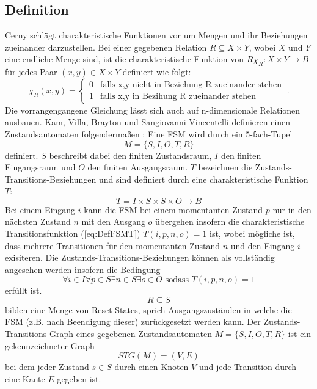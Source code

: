 \subsection{Definition}
\label{(subsec:DefFSM)}
Cerny \cite{Cer80} schlägt charakteristische Funktionen vor um Mengen und ihr Beziehungen zueinander darzustellen. Bei einer gegebenen Relation $R \subseteq X \times Y$, wobei $X$ und $Y$ eine endliche Menge sind, ist die charakteristische Funktion von $R \chi_R : X \times Y \rightarrow B$ für jedes Paar $(x,y) \in X \times Y$ definiert wie folgt:
\begin{equation}
\chi_R(x,y)=\begin{cases}
0 & \text{falls x,y nicht in Beziehung R zueinander stehen}\\
1& \text{falls x,y in Bezihung R zueinander stehen} 
\end{cases}\ \text{.}
\label{eq:charFunkt}
\end{equation}
Die vorrangengangene Gleichung lässt sich auch auf n-dimensionale Relationen ausbauen.
Kam, Villa, Brayton und Sangiovanni-Vincentelli \cite{KVBS97} definieren einen Zustandsautomaten folgendermaßen :
Eine FSM wird durch ein 5-fach-Tupel 
\begin{equation}
M=\{S,I,O,T,R\}
\label{eq:DefFSM}
\end{equation} definiert. $S$ beschreibt dabei den finiten Zustandsraum, $I$ den finiten Eingangsraum und $O$ den finiten Ausgangsraum. $T$ bezeichnen die Zustands-Transitions-Beziehungen und sind definiert durch eine charakteristische Funktion $T$: 
\begin{equation}
T=I \times S \times S \times O \xrightarrow {} B
\label{eq:DefFSMT}
\end{equation} Bei einem Eingang $i$ kann die FSM bei einem momentanten Zustand $p$ nur in den nächsten Zustand $n$ mit den Ausgang $o$ übergehen insofern die charakteristische Transitionsfunktion (\ref{eq:DefFSMT}) $T(i,p,n,o) = 1$ ist, wobei mögliche ist, dass mehrere Transitionen für den momentanten Zustand  $n$ und den Eingang $i$ exisiteren. Die Zustands-Transitions-Beziehungen können als vollständig angesehen werden insofern die Bedingung 
\begin{equation}
\forall i \in I \forall p \in S \exists n \in S \exists o \in O \text{ sodass } T(i,p,n,o) = 1
\label{eq:CondFSMT}
\end{equation}
erfüllt ist.
\begin{equation}
R \subseteq S
\label{eq:DefFSMR}
\end{equation} bilden eine Menge von Reset-States, sprich Ausgangszuständen in welche die FSM (z.B. nach Beendigung dieser) zurückgesetzt werden kann.
Der Zustands-Transitions-Graph eines gegebenen Zustandsautomaten $M = \{S,I,O,T,R\}$ ist ein gekennzeichneter Graph
\begin{equation}
STG(M) = (V,E)
\label{eq:GraphFSMT}
\end{equation}
bei dem jeder Zustand $s \in S$ durch einen Knoten $V$ und jede Transition durch eine Kante $E$ gegeben ist.
